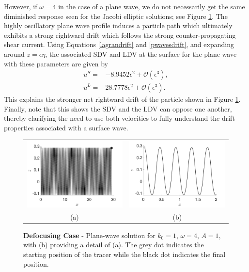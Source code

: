 \documentclass{JFM_Style/jfm}
\begin{document}
However, if $\omega=4$ in the case of a plane wave, we do not necessarily get the same diminished response seen for the Jacobi elliptic solutions; see Figure \ref{fig:defoc_pwave}.  The highly oscillatory plane wave profile induces a particle path which ultimately exhibits a strong rightward drift which follows the strong counter-propagating shear current.   Using Equations \eqref{lagrandrift} and \eqref{pwavesdrift}, and expanding around $z=\epsilon \eta$, the associated SDV and LDV at the surface for the plane wave with these parameters are given by 
\begin{align*}
u^{S} = & -8.9452\epsilon^{2} + \mathcal{O}(\epsilon^{3}),\\
\bar{u}^{L} = & 28.7778\epsilon^{2} + \mathcal{O}(\epsilon^{3}).
\end{align*}
This explains the stronger net rightward drift of the particle shown in Figure \ref{fig:defoc_pwave}.  Finally, note that this shows the SDV and the LDV can oppose one another, thereby clarifying the need to use both velocities to fully understand the drift properties associated with a surface wave.  
 \begin{figure}
\centering
\begin{tabular}{cc}
\includegraphics[width=.5\textwidth]{om_val_4_k0_1_ep_pt1_defoc_ztrack_pwave} & \includegraphics[width=.5\textwidth]{om_val_4_k0_1_ep_pt1_defoc_ztrack_pwave_detail}\\
(a) & (b)
\end{tabular}
\caption{\small {\bf Defocusing Case} - Plane-wave solution for $k_{0}=1$, $\omega=4$, $A=1$, with (b) providing a detail of (a).  The grey dot indicates the starting position of the tracer while the black dot indicates the final position.}
\label{fig:defoc_pwave}
\end{figure}
\end{document}
